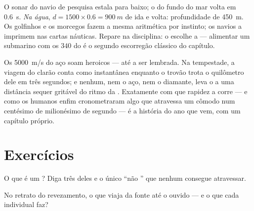 \begin{example}\label{ex:g7:sound-production:sonar}
O sonar do navio de pesquisa estala para baixo; o  do fundo do mar
volta em \qty{0.6}{s}. \emph{Na água},
$d = 1500 \times 0.6 = \qty{900}{m}$ de ida e volta: profundidade de
\qty{450}{m}. Os golfinhos e os morcegos fazem a mesma aritmética por
instinto; os navios a imprimem nas cartas náuticas. Repare na
disciplina: o  escolhe a  --- alimentar um 
submarino com os $340$ do  é o segundo escorregão clássico do
capítulo.
\end{example}

\begin{remark}\label{rem:g7:sound-production:light}
Os \qty{5000}{m/s} do aço soam heroicos --- até a  ser lembrada.
Na tempestade, a viagem do clarão conta como instantânea enquanto o
trovão trota o quilômetro dele em três segundos; e  nenhum, nem o
aço, nem o diamante, leva o  a uma distância sequer gritável do
ritmo da . Exatamente com que rapidez a  corre --- e como os
humanos enfim cronometraram algo que atravessa um cômodo num
centésimo de milionésimo de segundo --- é a história do ano que vem,
com um capítulo próprio.
\end{remark}

\section{Exercícios}

\begin{exercise}[$\star$]\label{exo:g7:sound-production:1}
O que é um ? Diga três deles e o único ``não '' que 
nenhum consegue atravessar.
\end{exercise}

\begin{exercise}[$\star$]\label{exo:g7:sound-production:2}
No retrato do revezamento, o que viaja da fonte até o ouvido --- e o
que cada  individual faz?
\end{exercise}

